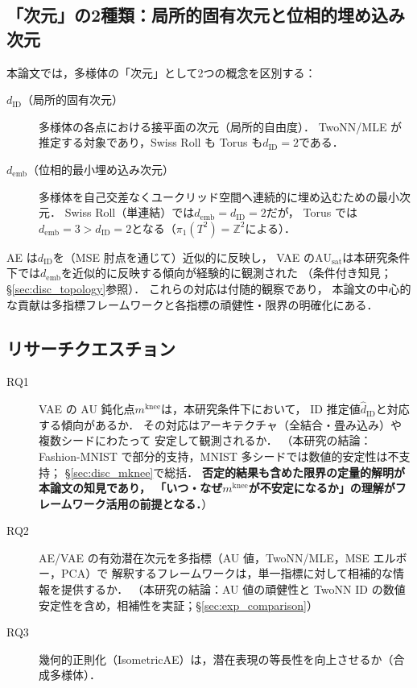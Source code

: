 \documentclass[11pt,a4paper]{jsarticle}
\newcommand{\dID}{d_{\mathrm{ID}}}
\newcommand{\AUsat}{\mathrm{AU}_{\mathrm{sat}}}
\newcommand{\mknee}{m^{\mathrm{knee}}}
\newcommand{\demb}{d_{\mathrm{emb}}}
\begin{document}
\subsection{「次元」の2種類：局所的固有次元と位相的埋め込み次元}\label{sec:intro_dim}

本論文では，多様体の「次元」として2つの概念を区別する：

\begin{description}
  \item[$\dID$（局所的固有次元）]
        多様体の各点における接平面の次元（局所的自由度）．
        TwoNN/MLE が推定する対象であり，Swiss Roll も Torus も$\dID = 2$である．
  \item[$\demb$（位相的最小埋め込み次元）]
        多様体を自己交差なくユークリッド空間へ連続的に埋め込むための最小次元．
        Swiss Roll（単連結）では$\demb = \dID = 2$だが，
        Torus では$\demb = 3 > \dID = 2$となる（$\pi_1(T^2) = \mathbb{Z}^2$による）．
\end{description}

AE は$\dID$を（MSE 肘点を通じて）近似的に反映し，
VAE の$\AUsat$は本研究条件下では$\demb$を近似的に反映する傾向が経験的に観測された
（条件付き知見；§\ref{sec:disc_topology}参照）．
これらの対応は付随的観察であり，
本論文の中心的な貢献は多指標フレームワークと各指標の頑健性・限界の明確化にある．

\subsection{リサーチクエスチョン}\label{sec:intro_rq}

\begin{description}
  \item[RQ1] VAE の AU 鈍化点$\mknee$は，本研究条件下において，
             ID 推定値$\hat{d}_\mathrm{ID}$と対応する傾向があるか．
             その対応はアーキテクチャ（全結合・畳み込み）や複数シードにわたって
             安定して観測されるか．
             （本研究の結論：Fashion-MNIST で部分的支持，MNIST 多シードでは数値的安定性は不支持；
             §\ref{sec:disc_mknee}で総括．
             \textbf{否定的結果も含めた限界の定量的解明が本論文の知見であり，
             「いつ・なぜ$\mknee$が不安定になるか」の理解がフレームワーク活用の前提となる．}）
  \item[RQ2] AE/VAE の有効潜在次元を多指標（AU 値，TwoNN/MLE，MSE エルボー，PCA）で
             解釈するフレームワークは，単一指標に対して相補的な情報を提供するか．
             （本研究の結論：AU 値の頑健性と TwoNN ID の数値安定性を含め，相補性を実証；§\ref{sec:exp_comparison}）
  \item[RQ3] 幾何的正則化（IsometricAE）は，潜在表現の等長性を向上させるか（合成多様体）．
\end{description}
\end{document}
